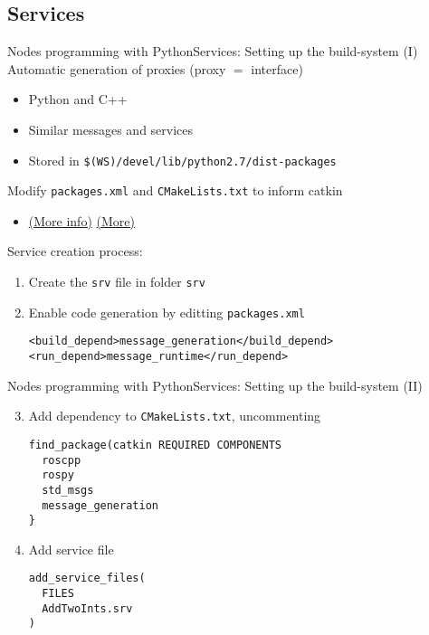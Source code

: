 \documentclass[10pt,compress]{beamer} %
\begin{document}
\subsection{Services}
\begin{frame}[fragile]{Nodes programming with Python}{Services: Setting up the build-system (I)}
	Automatic generation of proxies (proxy $=$ interface)
	\begin{itemize}
		\item Python and C++
		\item Similar messages and services
		\item Stored in \small{\texttt{\$(WS)/devel/lib/python2.7/dist-packages}}
	\end{itemize}
	Modify \texttt{packages.xml} and \texttt{CMakeLists.txt} to inform catkin
	\begin{itemize}
		\item \href{http://wiki.ros.org/ROS/Tutorials/CreatingMsgAndSrv}{(More info)} \href{http://answers.ros.org/question/114806/tutorial-116-importerror-no-module-named-beginner\_tutorialssrv-with-catkin-system-build/}{(More)}
	\end{itemize}
	Service creation process:
	\begin{enumerate}
			\item Create the \texttt{srv} file in folder \texttt{srv}
			\item Enable code generation by editting \texttt{packages.xml}
			\begin{verbatim}
<build_depend>message_generation</build_depend>
<run_depend>message_runtime</run_depend>
\end{verbatim}
	\end{enumerate}
\end{frame}

\begin{frame}[fragile]{Nodes programming with Python}{Services: Setting up the build-system (II)}
	\begin{enumerate}
		\setcounter{enumi}{2}
		\item Add dependency to \texttt{CMakeLists.txt}, uncommenting 
			\begin{verbatim}
find_package(catkin REQUIRED COMPONENTS
  roscpp
  rospy
  std_msgs
  message_generation
}
\end{verbatim}
		\item Add service file
			\begin{verbatim}
add_service_files(
  FILES
  AddTwoInts.srv
)
\end{verbatim}
		\end{enumerate}
\end{frame}
\end{document}
